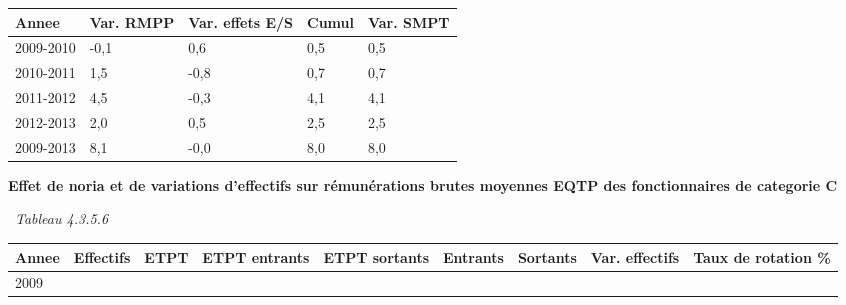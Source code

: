 \begin{longtable}[]{@{}lllll@{}}
\toprule
Annee & Var. RMPP & Var. effets E/S & Cumul & Var. SMPT\tabularnewline
\midrule
\endhead
2009-2010 & -0,1 & 0,6 & 0,5 & 0,5\tabularnewline
2010-2011 & 1,5 & -0,8 & 0,7 & 0,7\tabularnewline
2011-2012 & 4,5 & -0,3 & 4,1 & 4,1\tabularnewline
2012-2013 & 2,0 & 0,5 & 2,5 & 2,5\tabularnewline
2009-2013 & 8,1 & -0,0 & 8,0 & 8,0\tabularnewline
\bottomrule
\end{longtable}

\textbf{Effet de noria et de variations d'effectifs sur rémunérations
brutes moyennes EQTP des fonctionnaires de categorie C}

~\emph{Tableau 4.3.5.6}

\begin{longtable}[]{@{}lllllllll@{}}
\toprule
\begin{minipage}[b]{0.05\columnwidth}\raggedright
Annee\strut
\end{minipage} & \begin{minipage}[b]{0.08\columnwidth}\raggedright
Effectifs\strut
\end{minipage} & \begin{minipage}[b]{0.05\columnwidth}\raggedright
ETPT\strut
\end{minipage} & \begin{minipage}[b]{0.10\columnwidth}\raggedright
ETPT entrants\strut
\end{minipage} & \begin{minipage}[b]{0.10\columnwidth}\raggedright
ETPT sortants\strut
\end{minipage} & \begin{minipage}[b]{0.07\columnwidth}\raggedright
Entrants\strut
\end{minipage} & \begin{minipage}[b]{0.07\columnwidth}\raggedright
Sortants\strut
\end{minipage} & \begin{minipage}[b]{0.11\columnwidth}\raggedright
Var. effectifs\strut
\end{minipage} & \begin{minipage}[b]{0.14\columnwidth}\raggedright
Taux de rotation \%\strut
\end{minipage}\tabularnewline
\midrule
\endhead
\begin{minipage}[t]{0.05\columnwidth}\raggedright
2009\strut
\end{minipage} & \begin{minipage}[t]{0.08\columnwidth}\raggedright

\end{minipage}
\end{longtable}
